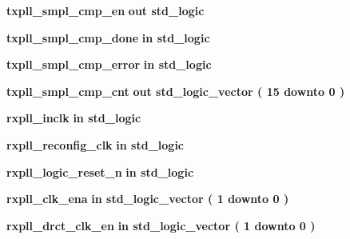\begin{DoxyCompactItemize}
\item 
{\bf txpll\+\_\+smpl\+\_\+cmp\+\_\+en}  {\bfseries {\bfseries \textcolor{keywordflow}{out}\textcolor{vhdlchar}{ }}} {\bfseries \textcolor{comment}{std\+\_\+logic}\textcolor{vhdlchar}{ }} 
\item 
{\bf txpll\+\_\+smpl\+\_\+cmp\+\_\+done}  {\bfseries {\bfseries \textcolor{keywordflow}{in}\textcolor{vhdlchar}{ }}} {\bfseries \textcolor{comment}{std\+\_\+logic}\textcolor{vhdlchar}{ }} 
\item 
{\bf txpll\+\_\+smpl\+\_\+cmp\+\_\+error}  {\bfseries {\bfseries \textcolor{keywordflow}{in}\textcolor{vhdlchar}{ }}} {\bfseries \textcolor{comment}{std\+\_\+logic}\textcolor{vhdlchar}{ }} 
\item 
{\bf txpll\+\_\+smpl\+\_\+cmp\+\_\+cnt}  {\bfseries {\bfseries \textcolor{keywordflow}{out}\textcolor{vhdlchar}{ }}} {\bfseries \textcolor{comment}{std\+\_\+logic\+\_\+vector}\textcolor{vhdlchar}{ }\textcolor{vhdlchar}{(}\textcolor{vhdlchar}{ }\textcolor{vhdlchar}{ } \textcolor{vhdldigit}{15} \textcolor{vhdlchar}{ }\textcolor{keywordflow}{downto}\textcolor{vhdlchar}{ }\textcolor{vhdlchar}{ } \textcolor{vhdldigit}{0} \textcolor{vhdlchar}{ }\textcolor{vhdlchar}{)}\textcolor{vhdlchar}{ }} 
\item 
{\bf rxpll\+\_\+inclk}  {\bfseries {\bfseries \textcolor{keywordflow}{in}\textcolor{vhdlchar}{ }}} {\bfseries \textcolor{comment}{std\+\_\+logic}\textcolor{vhdlchar}{ }} 
\item 
{\bf rxpll\+\_\+reconfig\+\_\+clk}  {\bfseries {\bfseries \textcolor{keywordflow}{in}\textcolor{vhdlchar}{ }}} {\bfseries \textcolor{comment}{std\+\_\+logic}\textcolor{vhdlchar}{ }} 
\item 
{\bf rxpll\+\_\+logic\+\_\+reset\+\_\+n}  {\bfseries {\bfseries \textcolor{keywordflow}{in}\textcolor{vhdlchar}{ }}} {\bfseries \textcolor{comment}{std\+\_\+logic}\textcolor{vhdlchar}{ }} 
\item 
{\bf rxpll\+\_\+clk\+\_\+ena}  {\bfseries {\bfseries \textcolor{keywordflow}{in}\textcolor{vhdlchar}{ }}} {\bfseries \textcolor{comment}{std\+\_\+logic\+\_\+vector}\textcolor{vhdlchar}{ }\textcolor{vhdlchar}{(}\textcolor{vhdlchar}{ }\textcolor{vhdlchar}{ } \textcolor{vhdldigit}{1} \textcolor{vhdlchar}{ }\textcolor{keywordflow}{downto}\textcolor{vhdlchar}{ }\textcolor{vhdlchar}{ } \textcolor{vhdldigit}{0} \textcolor{vhdlchar}{ }\textcolor{vhdlchar}{)}\textcolor{vhdlchar}{ }} 
\item 
{\bf rxpll\+\_\+drct\+\_\+clk\+\_\+en}  {\bfseries {\bfseries \textcolor{keywordflow}{in}\textcolor{vhdlchar}{ }}} {\bfseries \textcolor{comment}{std\+\_\+logic\+\_\+vector}\textcolor{vhdlchar}{ }\textcolor{vhdlchar}{(}\textcolor{vhdlchar}{ }\textcolor{vhdlchar}{ } \textcolor{vhdldigit}{1} \textcolor{vhdlchar}{ }\textcolor{keywordflow}{downto}\textcolor{vhdlchar}{ }\textcolor{vhdlchar}{ } \textcolor{vhdldigit}{0} \textcolor{vhdlchar}{ }\textcolor{vhdlchar}{)}\textcolor{vhdlchar}{ }} 

\end{DoxyCompactItemize}

